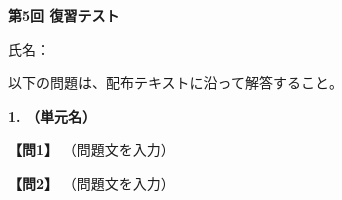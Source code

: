 
\begin{center}
{\Large\textbf{第5回 復習テスト}}
\end{center}
\vspace{0.15em}
\begin{flushright}
氏名：\testnameblank
\end{flushright}
\vspace{0.25em}
\noindent 以下の問題は、配布テキストに沿って解答すること。
\vspace{0.35em}

\noindent\textbf{1. （単元名）}

\noindent\textbf{【問1】} （問題文を入力）
\testqsep

\noindent\textbf{【問2】} （問題文を入力）
\testqsep
